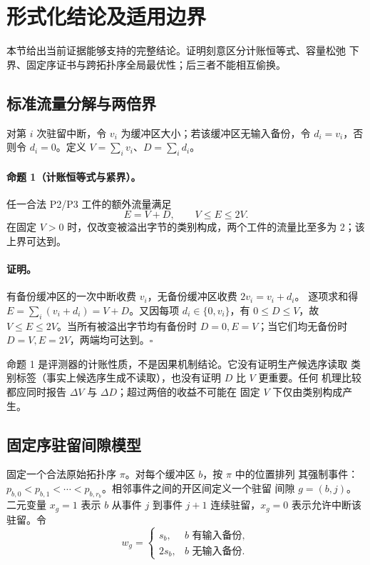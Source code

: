 \section{形式化结论及适用边界}\label{sec:supp-formal-zh}

本节给出当前证据能够支持的完整结论。证明刻意区分计账恒等式、容量松弛
下界、固定序证书与跨拓扑序全局最优性；后三者不能相互偷换。

\subsection{标准流量分解与两倍界}

对第 $i$ 次驻留中断，令 $v_i$ 为缓冲区大小；若该缓冲区无输入备份，令
$d_i=v_i$，否则令 $d_i=0$。定义
$V=\sum_i v_i$、$D=\sum_i d_i$。

\paragraph{命题 1（计账恒等式与紧界）。}
任一合法 P2/P3 工件的额外流量满足
\begin{equation}\label{eq:supp-identity-proof-zh}
 E=V+D,\qquad V\le E\le 2V.
\end{equation}
在固定 $V>0$ 时，仅改变被溢出字节的类别构成，两个工件的流量比至多为
2；该上界可达到。

\paragraph{证明。}
有备份缓冲区的一次中断收费 $v_i$，无备份缓冲区收费 $2v_i=v_i+d_i$。
逐项求和得
$E=\sum_i(v_i+d_i)=V+D$。又因每项 $d_i\in\{0,v_i\}$，有
$0\le D\le V$，故 $V\le E\le2V$。当所有被溢出字节均有备份时
$D=0,E=V$；当它们均无备份时 $D=V,E=2V$，两端均可达到。\hfill$\square$

命题 1 是评测器的计账性质，不是因果机制结论。它没有证明生产候选序读取
类别标签（事实上候选序生成不读取），也没有证明 $D$ 比 $V$ 更重要。任何
机理比较都应同时报告 $\Delta V$ 与 $\Delta D$；超过两倍的收益不可能在
固定 $V$ 下仅由类别构成产生。

\subsection{固定序驻留间隙模型}

固定一个合法原始拓扑序 $\pi$。对每个缓冲区 $b$，按 $\pi$ 中的位置排列
其强制事件：
$p_{b,0}<p_{b,1}<\cdots<p_{b,r_b}$。相邻事件之间的开区间定义一个驻留
间隙 $g=(b,j)$。二元变量 $x_g=1$ 表示 $b$ 从事件 $j$ 到事件 $j+1$
连续驻留，$x_g=0$ 表示允许中断该驻留。令
\begin{equation}
 w_g=\begin{cases}
 s_b,&b\text{ 有输入备份},\\
 2s_b,&b\text{ 无输入备份}.
 \end{cases}
\end{equation}

